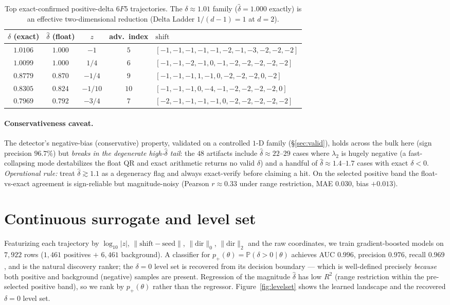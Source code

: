 \documentclass[11pt,a4paper]{article}
\theoremstyle{definition}
\newcommand{\dhat}{\hat{\delta}}
\begin{document}
\begin{table}[t]\centering
\caption{Top exact-confirmed positive-delta $6F5$ trajectories. The $\delta\approx1.01$ family
($\dhat=1.000$ exactly) is an effective two-dimensional reduction (Delta Ladder $1/(d-1)=1$ at
$d=2$).}
\label{tab:tophits}
\small
\setlength{\tabcolsep}{4pt}
\begin{tabular}{ccccl}
\toprule
$\delta$ (exact) & $\dhat$ (float) & $z$ & adv.\ index & $\mathrm{shift}$ \\
\midrule
$1.0106$ & $1.000$ & $-1$ & $5$ & $[-1,-1,-1,-1,-1,-2,-1,-3,-2,-2,-2]$ \\
$1.0099$ & $1.000$ & $1/4$ & $6$ & $[-1,-1,-2,-1,0,-1,-2,-2,-2,-2,-2]$ \\
$0.8779$ & $0.870$ & $-1/4$ & $9$ & $[-1,-1,-1,1,-1,0,-2,-2,-2,0,-2]$ \\
$0.8305$ & $0.824$ & $-1/10$ & $10$ & $[-1,-1,-1,0,-4,-1,-2,-2,-2,-2,0]$ \\
$0.7969$ & $0.792$ & $-3/4$ & $7$ & $[-2,-1,-1,-1,-1,0,-2,-2,-2,-2,-2]$ \\
\bottomrule
\end{tabular}
\end{table}

\paragraph{Conservativeness caveat.} The detector's negative-bias (conservative) property,
validated on a controlled $1$-D family (\S\ref{sec:valid}), holds across the bulk here (sign
precision $96.7\%$) but \emph{breaks in the degenerate high-$\dhat$ tail}: the $48$ artifacts
include $\dhat\approx22$--$29$ cases where $\lambda_2$ is hugely negative (a fast-collapsing
mode destabilizes the float QR and exact arithmetic returns no valid $\delta$) and a handful of
$\dhat\approx1.4$--$1.7$ cases with exact $\delta<0$. \emph{Operational rule:} treat
$\dhat\gtrsim1.1$ as a degeneracy flag and always exact-verify before claiming a hit. On the
selected positive band the float-vs-exact agreement is sign-reliable but magnitude-noisy
(Pearson $r\approx0.33$ under range restriction, MAE $0.030$, bias $+0.013$).

\section{Continuous surrogate and level set}
\label{sec:surrogate}
Featurizing each trajectory by $\log_{10}|z|$, $\lVert\mathrm{shift}-\text{seed}\rVert$,
$\lVert\mathrm{dir}\rVert_0$, $\lVert\mathrm{dir}\rVert_2$ and the raw coordinates, we train
gradient-boosted models on $7{,}922$ rows ($1{,}461$ positives $+$ $6{,}461$ background). A
classifier for $p_+(\theta)=\mathbb{P}(\delta>0\mid\theta)$ achieves AUC $0.996$, precision
$0.976$, recall $0.969$, and is the natural discovery ranker; the $\delta=0$ level set is
recovered from its decision boundary --- which is well-defined precisely \emph{because} both
positive and background (negative) samples are present. Regression of the magnitude $\dhat$
has low $R^2$ (range restriction within the pre-selected positive band), so we rank by
$p_+(\theta)$ rather than the regressor. Figure~\ref{fig:levelset} shows the learned landscape
and the recovered $\delta=0$ level set.
\end{document}
